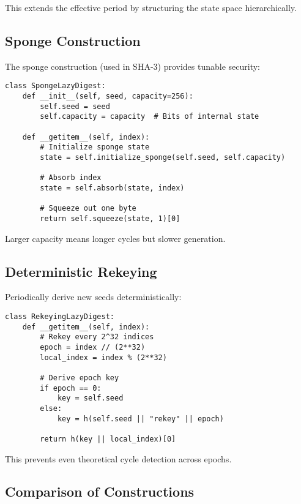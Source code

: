 \documentclass[11pt]{article}
\begin{document}
This extends the effective period by structuring the state space hierarchically.

\subsection{Sponge Construction}

The sponge construction (used in SHA-3) provides tunable security:

\begin{lstlisting}
class SpongeLazyDigest:
    def __init__(self, seed, capacity=256):
        self.seed = seed
        self.capacity = capacity  # Bits of internal state
        
    def __getitem__(self, index):
        # Initialize sponge state
        state = self.initialize_sponge(self.seed, self.capacity)
        
        # Absorb index
        state = self.absorb(state, index)
        
        # Squeeze out one byte
        return self.squeeze(state, 1)[0]
\end{lstlisting}

Larger capacity means longer cycles but slower generation.

\subsection{Deterministic Rekeying}

Periodically derive new seeds deterministically:

\begin{lstlisting}
class RekeyingLazyDigest:
    def __getitem__(self, index):
        # Rekey every 2^32 indices
        epoch = index // (2**32)
        local_index = index % (2**32)
        
        # Derive epoch key
        if epoch == 0:
            key = self.seed
        else:
            key = h(self.seed || "rekey" || epoch)
        
        return h(key || local_index)[0]
\end{lstlisting}

This prevents even theoretical cycle detection across epochs.

\subsection{Comparison of Constructions}
\end{document}
